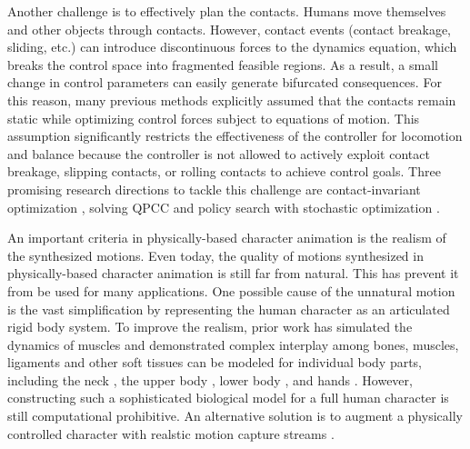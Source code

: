 Another challenge is to effectively plan the contacts. Humans move themselves and other objects through contacts. However, contact events (contact breakage, sliding, etc.) can introduce discontinuous forces to the dynamics equation, which breaks the control space into fragmented feasible regions. As a result, a small change in control parameters can easily generate bifurcated consequences. For this reason, many previous methods
explicitly assumed that the contacts remain static
\cite{Abe:2007,Jain:2009,Kim:2011:DCO} while optimizing control forces
subject to equations of motion. This assumption significantly
restricts the effectiveness of the controller for locomotion and balance
because the controller is not allowed to actively exploit contact
breakage, slipping contacts, or rolling contacts to achieve control
goals. Three promising research directions to tackle this challenge are contact-invariant optimization \cite{Mordatch:2012,Mordatch:2013}, solving QPCC \cite{Tan:2012} and policy search with stochastic optimization \cite{Wu:2010:TAB,Wang:2010,Mordatch:2010:RPL}.

An important criteria in physically-based character animation is the realism of the synthesized motions. Even today, the quality of motions synthesized in physically-based character animation is still far from natural. This has prevent it from be used for many applications. One possible cause of the unnatural motion is the vast simplification by representing the human character as an articulated rigid body system. To improve the realism, prior work has simulated the dynamics of muscles and demonstrated complex interplay among bones, muscles, ligaments and other soft tissues can be modeled for individual body parts, including
the neck \cite{Lee:2006}, the upper body \cite{Zordan:2006,Dilorenzo:2008,Lee:2009:CBM}, lower body \cite{Wang:2012}, and hands
\cite{Tsang:2005,Sueda:2008}. However, constructing such a sophisticated biological model for a full human character is still computational prohibitive. An alternative solution is to augment a physically controlled character with realstic motion capture streams \cite{daSilva:2008,Muico:2009:CAN,Liu:2010}. 














